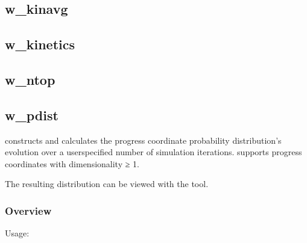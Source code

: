 \documentclass[letterpaper,10pt,english]{sphinxmanual}
\begin{document}
\subsection{w\_kinavg}
\label{\detokenize{users_guide/command_line_tools/w_kinavg:w-kinavg}}\label{\detokenize{users_guide/command_line_tools/w_kinavg:id1}}\label{\detokenize{users_guide/command_line_tools/w_kinavg::doc}}

\subsection{w\_kinetics}
\label{\detokenize{users_guide/command_line_tools/w_kinetics:w-kinetics}}\label{\detokenize{users_guide/command_line_tools/w_kinetics:id1}}\label{\detokenize{users_guide/command_line_tools/w_kinetics::doc}}

\subsection{w\_ntop}
\label{\detokenize{users_guide/command_line_tools/w_ntop:w-ntop}}\label{\detokenize{users_guide/command_line_tools/w_ntop:id1}}\label{\detokenize{users_guide/command_line_tools/w_ntop::doc}}

\subsection{w\_pdist}
\label{\detokenize{users_guide/command_line_tools/w_pdist:w-pdist}}\label{\detokenize{users_guide/command_line_tools/w_pdist:id1}}\label{\detokenize{users_guide/command_line_tools/w_pdist::doc}}
 constructs and calculates the progress coordinate probability
distribution’s evolution over a user\sphinxhyphen{}specified number of simulation iterations.
 supports progress coordinates with dimensionality ≥ 1.

The resulting distribution can be viewed with the {\hyperref[\detokenize{users_guide/command_line_tools/plothist:plothist}]{}} tool.


\subsubsection{Overview}
\label{\detokenize{users_guide/command_line_tools/w_pdist:overview}}
Usage:
\end{document}
